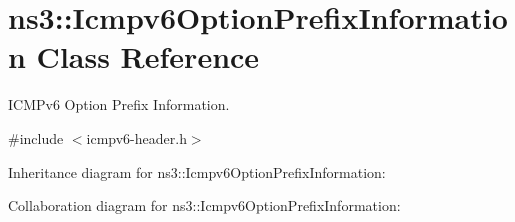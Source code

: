 \hypertarget{classns3_1_1Icmpv6OptionPrefixInformation}{}\section{ns3\+:\+:Icmpv6\+Option\+Prefix\+Information Class Reference}
\label{classns3_1_1Icmpv6OptionPrefixInformation}


I\+C\+M\+Pv6 Option Prefix Information.  




{\ttfamily \#include $<$icmpv6-\/header.\+h$>$}



Inheritance diagram for ns3\+:\+:Icmpv6\+Option\+Prefix\+Information\+:


Collaboration diagram for ns3\+:\+:Icmpv6\+Option\+Prefix\+Information\+:

